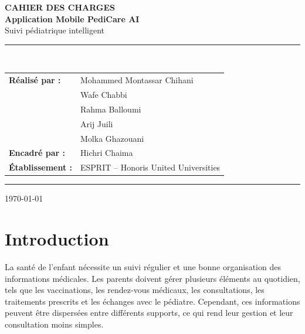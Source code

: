 \documentclass[11pt,a4paper]{article}
\begin{document}
\begin{titlepage}
\centering
\vspace*{3cm}

{\Huge\bfseries\color{navy} CAHIER DES CHARGES}\\[0.6cm]
{\LARGE\bfseries\color{blueaccent} Application Mobile PediCare AI}\\[0.4cm]
{\large\color{greytext} Suivi pédiatrique intelligent}\\[1.5cm]

\vspace{1cm}
\noindent\rule{12cm}{1.2pt}\\[1cm]

\begin{tabular}{ll}
\textbf{\color{navy}Réalisé par :} & Mohammed Montassar Chihani \\
                                    & Wafe Chabbi \\
                                    & Rahma Balloumi \\
                                    & Arij Juili \\
                                    & Molka Ghazouani \\[0.5cm]
\textbf{\color{navy}Encadré par :} & Hichri Chaima \\[0.5cm]
\textbf{\color{navy}Établissement :} & ESPRIT -- Honoris United Universities \\
\end{tabular}

\vspace{1.5cm}
\noindent\rule{12cm}{1.2pt}

\vfill
{\color{greytext}\today}
\end{titlepage}

\tableofcontents
\newpage

\section{Introduction}

La santé de l'enfant nécessite un suivi régulier et une bonne organisation des informations médicales. Les parents doivent gérer plusieurs éléments au quotidien, tels que les vaccinations, les rendez-vous médicaux, les consultations, les traitements prescrits et les échanges avec le pédiatre. Cependant, ces informations peuvent être dispersées entre différents supports, ce qui rend leur gestion et leur consultation moins simples.
\end{document}
